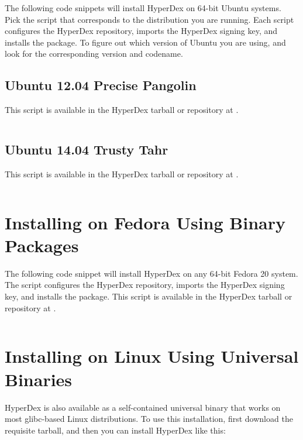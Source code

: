 The following code snippets will install HyperDex on 64-bit Ubuntu systems.
Pick the script that corresponds to the distribution you are running.  Each
script configures the HyperDex repository, imports the HyperDex signing key, and
installs the  package.  To figure out which version of Ubuntu you
are using,  and look for the corresponding version and
codename.

\subsection{Ubuntu 12.04 Precise Pangolin}

This script is available in the HyperDex tarball or repository at
.

\inputminted[frame=lines,framesep=2mm,firstline=5]{bash}{\topdir/install/ubuntu12.04-packages.sh}

\subsection{Ubuntu 14.04 Trusty Tahr}

This script is available in the HyperDex tarball or repository at
.

\inputminted[frame=lines,framesep=2mm,firstline=5]{bash}{\topdir/install/ubuntu14.04-packages.sh}

\section{Installing on Fedora Using Binary Packages}

The following code snippet will install HyperDex on any 64-bit Fedora 20 system.
The script configures the HyperDex repository, imports the HyperDex signing key,
and installs the  package.  This script is available in the
HyperDex tarball or repository at .

\inputminted[frame=lines,framesep=2mm,firstline=5]{bash}{\topdir/install/fedora-packages.sh}

\section{Installing on Linux Using Universal Binaries}
\label{sec:installation:universal-linux}

HyperDex is also available as a self-contained universal binary that works on
most glibc-based Linux distributions.  To use this installation, first download
the requisite tarball, and then you can install HyperDex like this:

